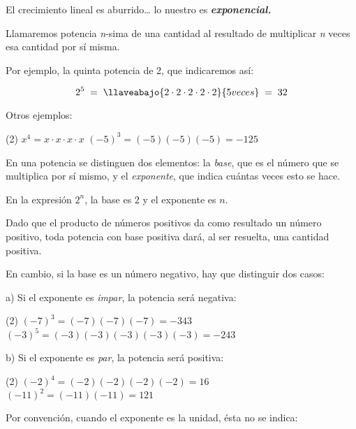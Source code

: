 \begin{capitulobox}
El crecimiento lineal es aburrido… lo nuestro es \textbf{\textit{exponencial.}}
\end{capitulobox}



Llamaremos potencia \emph{n}-sima de una cantidad al resultado de
multiplicar \emph{n} veces esa cantidad por sí misma.

Por ejemplo, la quinta potencia de 2, que indicaremos así:

\[
  2^5 \;=\;
  \llaveabajo{2 \cdot 2 \cdot 2 \cdot 2 \cdot 2}{5 veces}
  \;=\; 32
\]

Otros ejemplos:  

\begin{ejemplos2shortbull}(2)
  \task $x^4 = x \cdot x \cdot x \cdot x$
  \task $(-5)^3 = (-5)(-5)(-5) = -125$
\end{ejemplos2shortbull}

En una potencia se distinguen dos elementos: la \textit{base}, que es el
número que se multiplica por sí mismo, y el \textit{exponente}, que indica
cuántas veces esto se hace.

En la expresión \(2^n\), la base es 2 y el exponente es \(n\).

Dado que el producto de números positivos da como resultado un número
positivo, toda potencia con base positiva dará, al ser resuelta, una
cantidad positiva.  

En cambio, si la base es un número negativo, hay que distinguir dos
casos:

a) Si el exponente es \textit{impar}, la potencia será negativa: 

\begin{ejemplos2shortbull}(2)
  \task $(-7)^3 = (-7)(-7)(-7) = -343$
  \task $(-3)^5 = (-3)(-3)(-3)(-3)(-3) = -243$
\end{ejemplos2shortbull}


b) Si el exponente es \textit{par}, la potencia será positiva: 

\begin{ejemplos2shortbull}(2)
  \task $(-2)^4 = (-2)(-2)(-2)(-2) = 16$
  \task $(-11)^2 = (-11)(-11) = 121$
\end{ejemplos2shortbull}

Por convención, cuando el exponente es la unidad, ésta no se indica:

